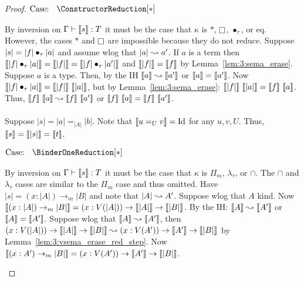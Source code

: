 \begin{proof}
    $\text{Case: }\begin{array}{c} \ConstructorReduction[*] \end{array}$
    \begin{proofcase}
        By inversion on $\Gamma \vdash \llbracket s \rrbracket : T$ it must be the case that $\kappa$ is $*$, $\kind$, $\bullet_\tau$, or eq.
        However, the cases $*$ and $\kind$ are impossible because they do not reduce.
        Suppose $|s| = |f| \bullet_{\tau} |a|$ and assume wlog that $|a| \leadsto a^\prime$.
        If $a$ is a term then $\llbracket |f| \bullet_{\tau} |a| \rrbracket = \llbracket |f| \rrbracket = \llbracket |f| \bullet_{\tau} |a^\prime| \rrbracket$ and $\llbracket |f| \rrbracket = \llbracket f \rrbracket$ by Lemma~\ref{lem:3:sema_erase}.
        Suppose $a$ is a type.
        Then, by the IH $\llbracket a \rrbracket \leadsto \llbracket a^\prime \rrbracket$ or $\llbracket a \rrbracket = \llbracket a^\prime \rrbracket$.
        Now $\sema{\app{|f|}{\tau}{|a|}} = \sema{|f|}\ \sema{|a|}$, but by Lemma~\ref{lem:3:sema_erase}: $\sema{|f|}\ \sema{|a|} = \sema{f}\ \sema{a}$.
        Thus, $\llbracket f \rrbracket\ \llbracket a \rrbracket \leadsto \llbracket f \rrbracket\ \llbracket a^\prime \rrbracket$ or $\sema{f}\ \sema{a} = \sema{f}\ \sema{a^\prime}$.
        \\ \\
        Suppose $|s| = |a| =_{|A|} |b|$.
        Note that $\llbracket u =_U v \rrbracket = \textnormal{Id}$ for any $u, v, U$.
        Thus, $\llbracket s \rrbracket = \llbracket |s| \rrbracket = \llbracket t \rrbracket$.
    \end{proofcase}

    $\text{Case: }\begin{array}{c} \BinderOneReduction[*] \end{array}$
    \begin{proofcase}
        By inversion on $\Gamma \vdash \llbracket s \rrbracket : T$ it must be the case that $\kappa$ is $\Pi_m$, $\lambda_\tau$, or $\cap$.
        The $\cap$ and $\lambda_\tau$ cases are similar to the $\Pi_m$ case and thus omitted.
        Have $|s| = (x : |A|) \to_m |B|$ and note that $|A| \leadsto A^\prime$.
        Suppose wlog that $A$ kind.
        Now $\llbracket (x : |A|) \to_m |B| \rrbracket = (x : V(|A|)) \to \llbracket |A| \rrbracket \to \llbracket |B| \rrbracket$.
        By the IH: $\llbracket A \rrbracket \leadsto \llbracket A^\prime \rrbracket$ or $\llbracket A \rrbracket = \llbracket A^\prime \rrbracket$.
        Suppose wlog that $\llbracket A \rrbracket \leadsto \llbracket A^\prime \rrbracket$, then $(x : V(|A|)) \to \llbracket |A| \rrbracket \to \llbracket |B| \rrbracket \leadsto (x : V(A^\prime)) \to \llbracket A^\prime \rrbracket \to \llbracket |B| \rrbracket$ by Lemma~\ref{lem:3:vsema_erase_red_step}.
        Now $\llbracket (x : A^\prime) \to_m |B| \rrbracket = (x : V(A^\prime)) \to \llbracket A^\prime \rrbracket \to \llbracket |B| \rrbracket$.
    \end{proofcase}


\end{proof}
